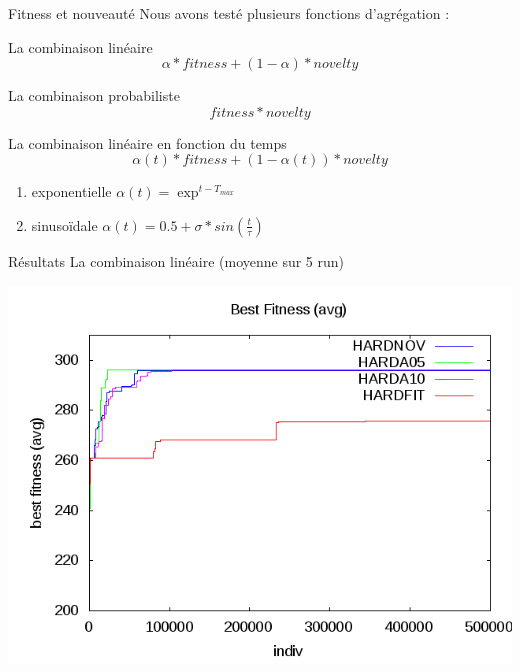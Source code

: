 \documentclass{beamer}
\begin{document}
\begin{frame}{Fitness et nouveauté}
	Nous avons testé plusieurs fonctions d'agrégation :
	\begin{block}{La combinaison linéaire}
		$$\alpha*fitness + (1 - \alpha)*novelty$$
	\end{block}
	\begin{block}{La combinaison probabiliste}
		$$fitness * novelty$$
	\end{block}
	\begin{block}{La combinaison linéaire en fonction du temps}
		$$\alpha(t)*fitness + (1 - \alpha(t))*novelty$$
		\begin{enumerate}
			\item exponentielle	$\alpha(t) = \exp^{t - T_{max}}$
			\item sinusoïdale $\alpha(t) = 0.5+\sigma*sin(\frac{t}{\tau})$
		\end{enumerate}
	\end{block}
\end{frame}


\begin{frame}{Résultats}
La combinaison linéaire (moyenne sur 5 run)
\begin{center}
    \includegraphics[width=.95\linewidth]{images/hard_bestfitness_means}
\end{center}
\end{frame}


\end{document}
